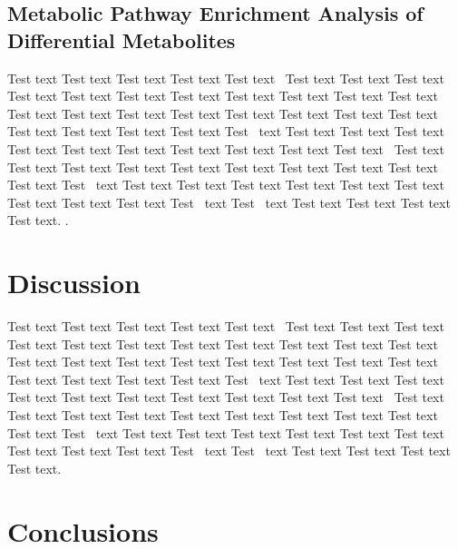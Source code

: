 \documentclass[animals,article,accept,moreauthors,pdftex]{Definitions/mdpi}
\begin{document}
\subsection{Metabolic Pathway Enrichment Analysis of Differential Metabolites \label{sect:sec3dot4-animals-4264543}}

 Test text Test text Test text Test text Test text~\cite{B1-animals-4264543} Test text Test text Test text Test text Test text Test text Test text Test text Test text Test text Test text Test text Test text Test text Test text Test text Test text Test text Test text Test text Test text Test text Test text Test~\cite{B2-animals-4264543} text Test text Test text Test text Test text Test text Test text Test text Test text Test text Test text~\cite{B3-animals-4264543} Test text Test text Test text Test text Test text Test text Test text Test text Test text Test text Test~\cite{B4-animals-4264543} text Test text Test text Test text Test text Test text Test text Test text Test text Test text Test~\cite{B5-animals-4264543} text Test~\cite{B6-animals-4264543} text Test text Test text Test text Test text.
.    




\section{Discussion \label{sect:sec4-animals-4264543}}

Test text Test text Test text Test text Test text~\cite{B1-animals-4264543} Test text Test text Test text Test text Test text Test text Test text Test text Test text Test text Test text Test text Test text Test text Test text Test text Test text Test text Test text Test text Test text Test text Test text Test~\cite{B2-animals-4264543} text Test text Test text Test text Test text Test text Test text Test text Test text Test text Test text~\cite{B3-animals-4264543} Test text Test text Test text Test text Test text Test text Test text Test text Test text Test text Test~\cite{B4-animals-4264543} text Test text Test text Test text Test text Test text Test text Test text Test text Test text Test~\cite{B5-animals-4264543} text Test~\cite{B6-animals-4264543} text Test text Test text Test text Test text.


\section{Conclusions \label{sect:sec5-animals-4264543}}
\end{document}
